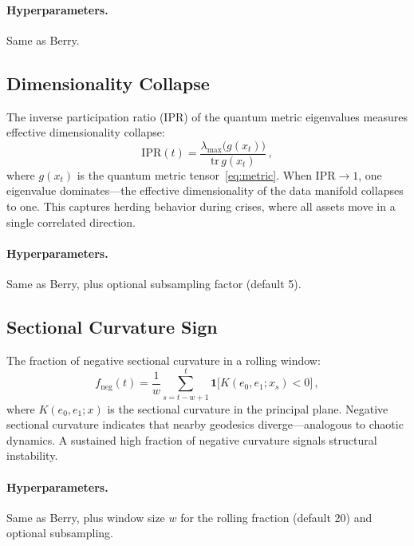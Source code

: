 \paragraph{Hyperparameters.}  Same as Berry.

\subsection{Dimensionality Collapse}\label{subsec:dim_collapse}

The inverse participation ratio (IPR) of the quantum metric eigenvalues
measures effective dimensionality collapse:
\begin{equation}\label{eq:dim_collapse}
  \mathrm{IPR}(t) = \frac{\lambda_{\max}\bigl(g(x_t)\bigr)}
  {\mathrm{tr}\,g(x_t)}\,,
\end{equation}
where $g(x_t)$ is the quantum metric tensor~\eqref{eq:metric}.  When
$\mathrm{IPR} \to 1$, one eigenvalue dominates---the effective
dimensionality of the data manifold collapses to one.  This captures
herding behavior during crises, where all assets move in a single
correlated direction.

\paragraph{Hyperparameters.}  Same as Berry, plus optional subsampling
factor (default 5).

\subsection{Sectional Curvature Sign}\label{subsec:sectional_sign}

The fraction of negative sectional curvature in a rolling window:
\begin{equation}\label{eq:neg_frac}
  f_{\mathrm{neg}}(t) = \frac{1}{w} \sum_{s=t-w+1}^{t}
  \mathbf{1}\bigl[K(e_0, e_1; x_s) < 0\bigr]\,,
\end{equation}
where $K(e_0, e_1; x)$ is the sectional curvature in the principal
plane.  Negative sectional curvature indicates that nearby geodesics
diverge---analogous to chaotic dynamics.  A sustained high fraction
of negative curvature signals structural instability.

\paragraph{Hyperparameters.}  Same as Berry, plus window size $w$
for the rolling fraction (default 20) and optional subsampling.


